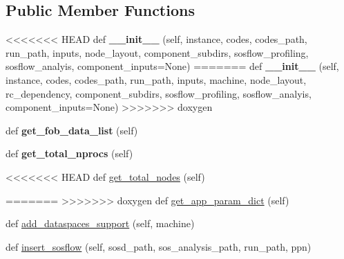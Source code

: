 \subsection*{Public Member Functions}
\begin{DoxyCompactItemize}
\item 
<<<<<<< HEAD
\mbox{\label{classcodar_1_1cheetah_1_1model_1_1_run_a6329bdbb131c9c7e621a3177f7066fc9}} 
def {\bfseries \+\_\+\+\_\+init\+\_\+\+\_\+} (self, instance, codes, codes\+\_\+path, run\+\_\+path, inputs, node\+\_\+layout, component\+\_\+subdirs, sosflow\+\_\+profiling, sosflow\+\_\+analyis, component\+\_\+inputs=None)
=======
\mbox{\label{classcodar_1_1cheetah_1_1model_1_1_run_a6b83070bbd7f8675be9f9ff7e91cadff}} 
def {\bfseries \+\_\+\+\_\+init\+\_\+\+\_\+} (self, instance, codes, codes\+\_\+path, run\+\_\+path, inputs, machine, node\+\_\+layout, rc\+\_\+dependency, component\+\_\+subdirs, sosflow\+\_\+profiling, sosflow\+\_\+analyis, component\+\_\+inputs=None)
>>>>>>> doxygen
\item 
\mbox{\label{classcodar_1_1cheetah_1_1model_1_1_run_a8d10cb20808cc4c66a59f949ec40aeb8}} 
def {\bfseries get\+\_\+fob\+\_\+data\+\_\+list} (self)
\item 
\mbox{\label{classcodar_1_1cheetah_1_1model_1_1_run_af56a27848d2d8b900435b462ac6b74d8}} 
def {\bfseries get\+\_\+total\+\_\+nprocs} (self)
\item 
<<<<<<< HEAD
def \hyperlink{classcodar_1_1cheetah_1_1model_1_1_run_ac75c0038a278def4dce9aaf37fbe1c70}{get\+\_\+total\+\_\+nodes} (self)
\item 
=======
>>>>>>> doxygen
def \hyperlink{classcodar_1_1cheetah_1_1model_1_1_run_a30df1617b81f2cfcde9f57d443ca25cb}{get\+\_\+app\+\_\+param\+\_\+dict} (self)
\item 
def \hyperlink{classcodar_1_1cheetah_1_1model_1_1_run_a5fc7b380524cfda5c77104b61e4441fd}{add\+\_\+dataspaces\+\_\+support} (self, machine)
\item 
def \hyperlink{classcodar_1_1cheetah_1_1model_1_1_run_a8f4284bf79f8b909c4c2d0ef5319e3bc}{insert\+\_\+sosflow} (self, sosd\+\_\+path, sos\+\_\+analysis\+\_\+path, run\+\_\+path, ppn)
\end{DoxyCompactItemize}
